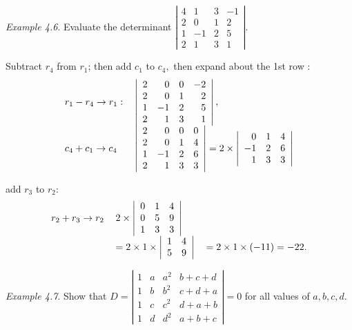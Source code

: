 \documentclass[
  letterpaper,
  DIV=11,
  numbers=noendperiod]{scrartcl}
\theoremstyle{remark}
\begin{document}
\emph{Example 4.6}. Evaluate the determinant \(\left|
\begin{array}{rrrr}
4 & 1 & 3 & -1 \\
2 & 0 & 1 & 2 \\
1 & -1 & 2 & 5 \\
2 & 1 & 3 & 1
\end{array}
\right|\).

Subtract \(r_{4}\) from \(r_{1}\); then add \(c_{1}\) to \(c_{4},\) then
expand about the 1st row \(:\) \[\begin{tabular}[t]{ll}
$r_{1}-r_{4}\rightarrow r_{1}:$ & $\left| 
\begin{array}{rrrr}
2 & 0 & 0 & -2 \\ 
2 & 0 & 1 & 2 \\ 
1 & -1 & 2 & 5 \\ 
2 & 1 & 3 & 1
\end{array}
\right| ,$ \\ 
$c_{4}+c_{1}\rightarrow c_{4}$ & $\left| 
\begin{array}{rrrr}
2 & 0 & 0 & 0 \\ 
2 & 0 & 1 & 4 \\ 
1 & -1 & 2 & 6 \\ 
2 & 1 & 3 & 3
\end{array}
\right| =2\times \left| 
\begin{array}{rrr}
0 & 1 & 4 \\ 
-1 & 2 & 6 \\ 
1 & 3 & 3
\end{array}
\right| $
\end{tabular}\]

add \(r_{3}\) to \(r_{2}:\) \[\begin{tabular}[t]{lll}
$r_{2}+r_{3}\rightarrow r_{2}$ & $2\times \left| 
\begin{array}{rrr}
0 & 1 & 4 \\ 
0 & 5 & 9 \\ 
1 & 3 & 3
\end{array}
\right| $ &  \\ 
& $=2\times 1\times \left| 
\begin{array}{rr}
1 & 4 \\ 
5 & 9
\end{array}
\right| $ & $=2\times 1\times \left( -11\right) =-22.$
\end{tabular}\]

\emph{Example 4.7}. Show that \(D=\left|
\begin{array}{cccc}
1 & a & a^{2} & b+c+d \\
1 & b & b^{2} & c+d+a \\
1 & c & c^{2} & d+a+b \\
1 & d & d^{2} & a+b+c
\end{array}
\right| =0\) for all values of \(a,b,c,d.\)
\end{document}
